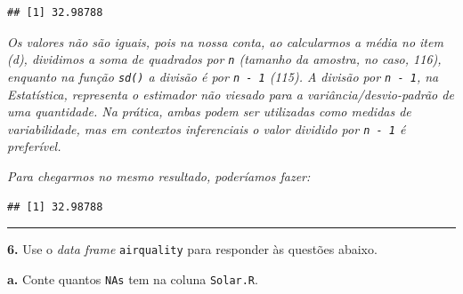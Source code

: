 \documentclass[
]{book}
\newenvironment{Shaded}{\begin{snugshade}}{\end{snugshade}}
\newcommand{\AttributeTok}[1]{\textcolor[rgb]{0.77,0.63,0.00}{#1}}
\newcommand{\CommentTok}[1]{\textcolor[rgb]{0.56,0.35,0.01}{\textit{#1}}}
\newcommand{\ConstantTok}[1]{\textcolor[rgb]{0.00,0.00,0.00}{#1}}
\newcommand{\DecValTok}[1]{\textcolor[rgb]{0.00,0.00,0.81}{#1}}
\newcommand{\FunctionTok}[1]{\textcolor[rgb]{0.00,0.00,0.00}{#1}}
\newcommand{\NormalTok}[1]{#1}
\newcommand{\OtherTok}[1]{\textcolor[rgb]{0.56,0.35,0.01}{#1}}
\newcommand{\SpecialCharTok}[1]{\textcolor[rgb]{0.00,0.00,0.00}{#1}}
\begin{document}
\begin{Shaded}
\end{Shaded}

\begin{verbatim}
## [1] 32.98788
\end{verbatim}

\emph{Os valores não são iguais, pois na nossa conta, ao calcularmos a média no item (d), dividimos a soma de quadrados por \texttt{n} (tamanho da amostra, no caso, 116), enquanto na função \texttt{sd()} a divisão é por \texttt{n\ -\ 1} (115). A divisão por \texttt{n\ -\ 1}, na Estatística, representa o estimador não viesado para a variância/desvio-padrão de uma quantidade. Na prática, ambas podem ser utilizadas como medidas de variabilidade, mas em contextos inferenciais o valor dividido por \texttt{n\ -\ 1} é preferível.}

\emph{Para chegarmos no mesmo resultado, poderíamos fazer:}

\begin{Shaded}
\end{Shaded}

\begin{verbatim}
## [1] 32.98788
\end{verbatim}

\begin{center}\rule{0.5\linewidth}{0.5pt}\end{center}

\textbf{6.} Use o \emph{data frame} \texttt{airquality} para responder às questões abaixo.

\textbf{a.} Conte quantos \texttt{NAs} tem na coluna \texttt{Solar.R}.
\end{document}
